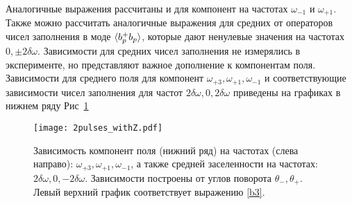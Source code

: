 Аналогичные выражения рассчитаны и для компонент на частотах $\omega_{-1}$ и $\omega_{+1}$. Также можно рассчитать аналогичные выражения для средних от операторов чисел заполнения в моде $\braket{b^+_p b_p}$, которые дают ненулевые значения на частотах $0, \pm 2 \delta\omega$. Зависимости для средних чисел заполнения не измерялись в эксперименте, но представляют важное дополнение к компонентам поля. Зависимости для среднего поля для компонент $\omega_{+3}, \omega_{+1}, \omega_{-1}$ и соответствующие зависимости чисел заполнения для частот $2\delta\omega, 0, 2\delta\omega$ приведены на графиках в нижнем ряду Рис~\ref{fig: 2pulses}
\begin{figure}
\centering
\texttt{[image: 2pulses\_withZ.pdf]}
\caption[Зависимости полей и средних заселенностей на боковых компонентах от углов поворота для квантового смешения]{Зависимость компонент поля (нижний ряд) на частотах (слева направо): $\omega_{+3}, \omega_{+1}, \omega_{-1}$, а также средней заселенности на частотах: $2\delta\omega, 0, -2\delta\omega$. Зависимости построены от углов поворота $\theta_-, \theta_+$. Левый верхний график соответствует выражению \eqref{b3}.   }
\label{fig: 2pulses}
\end{figure}

